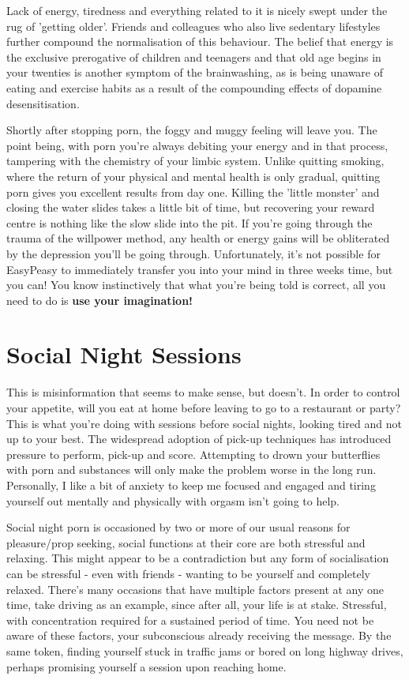 \documentclass[
]{book}
\begin{document}
Lack of energy, tiredness and everything related to it is nicely swept under the rug of 'getting older'. Friends and colleagues who also live sedentary lifestyles further compound the normalisation of this behaviour. The belief that energy is the exclusive prerogative of children and teenagers and that old age begins in your twenties is another symptom of the brainwashing, as is being unaware of eating and exercise habits as a result of the compounding effects of dopamine desensitisation.

Shortly after stopping porn, the foggy and muggy feeling will leave you. The point being, with porn you're always debiting your energy and in that process, tampering with the chemistry of your limbic system. Unlike quitting smoking, where the return of your physical and mental health is only gradual, quitting porn gives you excellent results from day one. Killing the 'little monster' and closing the water slides takes a little bit of time, but recovering your reward centre is nothing like the slow slide into the pit. If you're going through the trauma of the willpower method, any health or energy gains will be obliterated by the depression you'll be going through. Unfortunately, it's not possible for EasyPeasy to immediately transfer you into your mind in three weeks time, but you can! You know instinctively that what you're being told is correct, all you need to do is \textbf{use your imagination!}

\hypertarget{social-night-sessions}{%
\section{Social Night Sessions}\label{social-night-sessions}}

This is misinformation that seems to make sense, but doesn't. In order to control your appetite, will you eat at home before leaving to go to a restaurant or party? This is what you're doing with sessions before social nights, looking tired and not up to your best. The widespread adoption of pick-up techniques has introduced pressure to perform, pick-up and score. Attempting to drown your butterflies with porn and substances will only make the problem worse in the long run. Personally, I like a bit of anxiety to keep me focused and engaged and tiring yourself out mentally and physically with orgasm isn't going to help.

Social night porn is occasioned by two or more of our usual reasons for pleasure/prop seeking, social functions at their core are both stressful and relaxing. This might appear to be a contradiction but any form of socialisation can be stressful - even with friends - wanting to be yourself and completely relaxed. There's many occasions that have multiple factors present at any one time, take driving as an example, since after all, your life is at stake. Stressful, with concentration required for a sustained period of time. You need not be aware of these factors, your subconscious already receiving the message. By the same token, finding yourself stuck in traffic jams or bored on long highway drives, perhaps promising yourself a session upon reaching home.
\end{document}
